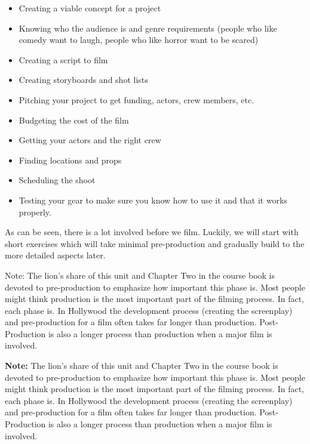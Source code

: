 \documentclass[
]{book}
\providecommand{\tightlist}{%
  \setlength{\itemsep}{0pt}\setlength{\parskip}{0pt}}
\begin{document}
\begin{itemize}
\tightlist
\item
  Creating a viable concept for a project\\
\item
  Knowing who the audience is and genre requirements (people who like comedy want to laugh, people who like horror want to be scared)\\
\item
  Creating a script to film\\
\item
  Creating storyboards and shot lists\\
\item
  Pitching your project to get funding, actors, crew members, etc.\\
\item
  Budgeting the cost of the film\\
\item
  Getting your actors and the right crew\\
\item
  Finding locations and props\\
\item
  Scheduling the shoot\\
\item
  Testing your gear to make sure you know how to use it and that it works properly.
\end{itemize}

As can be seen, there is a lot involved before we film. Luckily, we will start with short exercises which will take minimal pre-production and gradually build to the more detailed aspects later.

Note: The lion's share of this unit and Chapter Two in the course book is devoted to pre-production to emphasize how important this phase is. Most people might think production is the most important part of the filming process. In fact, each phase is. In Hollywood the development process (creating the screenplay) and pre-production for a film often takes far longer than production. Post-Production is also a longer process than production when a major film is involved.

\textbf{Note:} The lion's share of this unit and Chapter Two in the course book is devoted to pre-production to emphasize how important this phase is. Most people might think production is the most important part of the filming process. In fact, each phase is. In Hollywood the development process (creating the screenplay) and pre-production for a film often takes far longer than production. Post-Production is also a longer process than production when a major film is involved.
\end{document}
